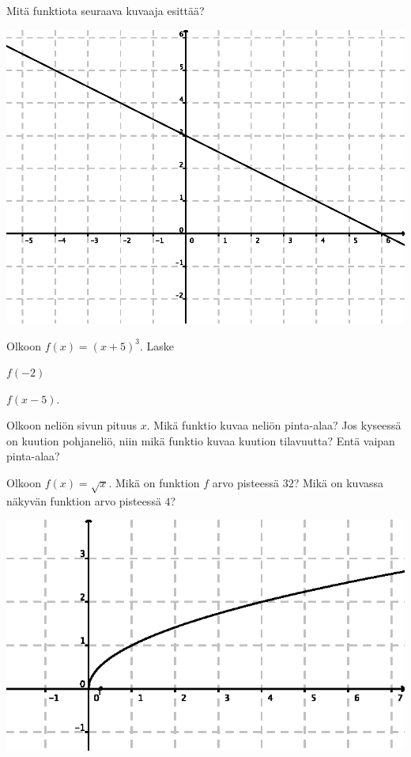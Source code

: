 \begin{tehtava}
Mitä funktiota seuraava kuvaaja esittää?\begin{center}\includegraphics{figs/kuvaaja.eps}\end{center}
\end{tehtava}

\begin{tehtava}
Olkoon $f(x) = (x+5)^3$. Laske
\begin{kohdat}
\item \(f(-2)\)
\item \(f(x-5).\)
\end{kohdat}
\end{tehtava}

\begin{tehtava}
Olkoon neliön sivun pituus $x$. Mikä funktio kuvaa neliön pinta-alaa? Jos kyseessä on kuution pohjaneliö, niin mikä funktio kuvaa kuution tilavuutta? Entä vaipan pinta-alaa?
\end{tehtava}

\begin{tehtava}
Olkoon $f(x)=\sqrt{x}$. Mikä on funktion $f$ arvo pisteessä $32$? Mikä on kuvassa näkyvän funktion arvo pisteessä $4$?\begin{center}\includegraphics{figs/neliojuuri.eps}\end{center}
\end{tehtava}

